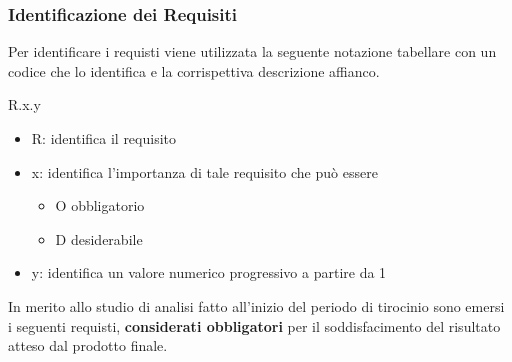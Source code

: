 \subsubsection{Identificazione dei Requisiti}
Per identificare i requisti viene utilizzata la seguente notazione tabellare con un codice che lo identifica e la corrispettiva descrizione affianco.
\begin{center}
    R.x.y
\end{center}
\begin{itemize}
    \item R: identifica il requisito
    \item x: identifica l'importanza di tale requisito che può essere
        \begin{itemize}
            \item O obbligatorio
            \item D desiderabile
        \end{itemize}
    \item y: identifica un valore numerico progressivo a partire da 1
\end{itemize}
In merito allo studio di analisi fatto all'inizio del periodo di tirocinio sono emersi i seguenti requisti, \textbf{considerati obbligatori} per il soddisfacimento del risultato atteso dal prodotto finale.

